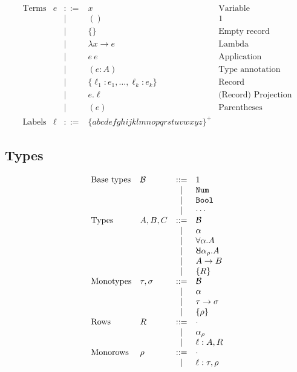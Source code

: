 \documentclass{article}
\newcommand{\code}[1]{\texttt{#1}}
\newcommand{\rcd}[1]{\{#1\}}
\newcommand{\B}{\mathcal{B}}
\newcommand{\rowall}{\rotatebox[origin=c]{180}{\(\mathsf{R}\)}}
\newcommand{\rowvar}{\alpha_\rho}
\newcommand{\define}{::=}
\newcommand{\prjSymbol}{.}
\begin{document}
\[
  \begin{array}{llcll}
    \text{Terms} & e & \define & x & \text{Variable} \\
                 & & | & () & \text{1} \\
                 & & | & \rcd{} & \text{Empty record}\\
                 & & | & \lambda x \to e  & \text{Lambda} \\
                 & & | & e\ e & \text{Application} \\
                 & & | & (e : A) & \text{Type annotation}\\
                 & & | & \rcd{\ell_1 : e_1, \dots, \ell_k : e_k} & \text{Record}
    \\
                 & & | & e \prjSymbol \ell & \text{(Record) Projection} \\
                 & & | & (e) & \text{Parentheses} \\
   \text{Labels} & \ell & \define & \{abcdefghijklmnopqrstuvwxyz\}^+
  \end{array}
\]

\subsection{Types}
\[
  \begin{array}{llcl}
    \text{Base types} & \B & \define & 1 \\
                      & & | & \code{Num} \\
                      & & | & \code{Bool} \\
                      & & | & \cdots \\
    \text{Types} & A, B, C & \define & \B \\
                      & & | & \alpha \\
                      & & | & \forall \alpha. A \\
                      & & | & \rowall \rowvar. A \\
                      & & | & A \to B \\
                      & & | & \rcd{R} \\
    \text{Monotypes} & \tau, \sigma & \define & \B \\
                      & & | & \alpha \\
                      & & | & \tau \to \sigma \\
                      & & | & \rcd{\rho} \\
    \text{Rows} & R & \define & \cdot \\
                      & & | & \rowvar \\
                      & & | & \ell : A, R \\
    \text{Monorows} & \rho & \define & \cdot \\
                      & & | & \ell : \tau, \rho
  \end{array}
\]
\end{document}
